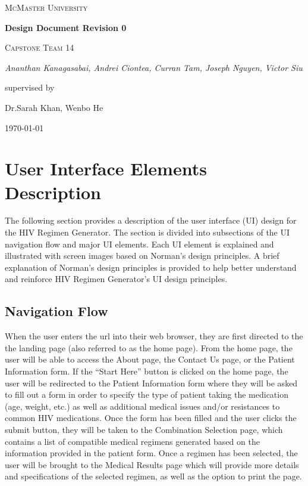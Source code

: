 \documentclass[12pt]{article}
\begin{document}
\begin{titlepage}
	\centering
	{\scshape\LARGE McMaster University \par}
	\vspace{1.5cm}
	{\huge\bfseries Design Document Revision 0 \par}

	\vspace{1cm}
	{\scshape\Large Capstone Team 14\par}
	{\Large\itshape Ananthan Kanagasabai, Andrei Ciontea, Curran Tam, Joseph Nguyen, Victor Siu \par}
	\vspace{3cm}
	\vfill
	supervised by\par
	Dr.Sarah Khan, Wenbo He

	\vfill
	{\large \today\par}
\end{titlepage}

\newpage

\tableofcontents
\listoffigures
\newpage


\section{User Interface Elements Description}
The following section provides a description of the user interface (UI) design for the HIV Regimen Generator. The section is divided into subsections of the UI navigation flow and major UI elements. Each UI element is explained and illustrated with screen images based on Norman’s design principles. A brief explanation of Norman’s design principles is provided to help better understand and reinforce HIV Regimen Generator’s UI design principles.

\subsection{Navigation Flow}
When the user enters the url into their web browser, they are first directed to the the landing page (also referred to as the home page). From the home page, the user will be able to access the About page, the Contact Us page, or the Patient Information form. If the “Start Here” button is clicked on the home page, the user will be redirected to the Patient Information form where they will be asked to fill out a form in order to specify the type of patient taking the medication (age, weight, etc.) as well as additional medical issues and/or resistances to common HIV medications. Once the form has been filled and the user clicks the submit button, they will be taken to the Combination Selection page, which contains a list of compatible medical regimens generated based on the information provided in the patient form. Once a  regimen has been selected, the user will be brought to the Medical Results page which will provide more details and specifications of the selected regimen, as well as the option to print the page.
\end{document}
